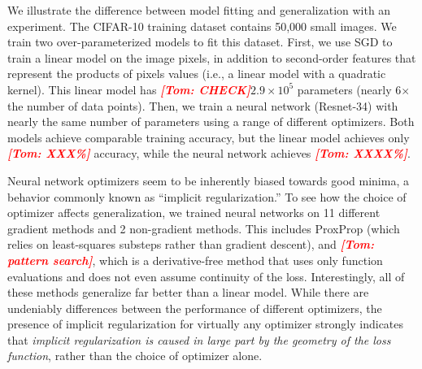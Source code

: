 \documentclass{article}
\newcommand{\tom}[1]{{  \textcolor{red}{\bf \em [Tom: #1]}}}
\newcommand{\ronny}[1]{{  \textcolor{blue}{\bf \em [Ronny: #1]}}}
\begin{document}
   We illustrate the difference between model fitting and generalization with an experiment.  The CIFAR-10 training dataset contains 50,000 small images.  We train two over-parameterized models to fit this dataset.
 First, we use SGD to train a linear model on the image pixels, in addition to second-order features that represent the products of pixels values (i.e., a linear model with a quadratic kernel).  This linear model has \tom{CHECK}$2.9\times 10^5$ parameters (nearly 6$\times$ the number of data points).  Then, we train a neural network (Resnet-34) with nearly the same number of parameters using a range of different optimizers.  Both models achieve comparable training accuracy,  but the linear model achieves only \tom{XXX\%} accuracy, while the neural network achieves \tom{XXXX\%}.

 Neural network optimizers seem to be inherently biased towards good minima,  a behavior commonly known as ``implicit regularization.''   To see how the choice of optimizer affects generalization, we trained neural networks on 11 different gradient methods and 2 non-gradient methods. This includes ProxProp (which relies on least-squares substeps rather than gradient descent), and \tom{pattern search}, which is a derivative-free method that uses only function evaluations and does not even assume continuity of the loss.  Interestingly, all of these methods generalize far better than a linear model.   While there are undeniably differences between the performance of different optimizers, the presence of implicit regularization for virtually any optimizer strongly indicates that {\em implicit regularization is caused in large part by the geometry of the loss function}, rather than the choice of optimizer alone.

\end{document}
